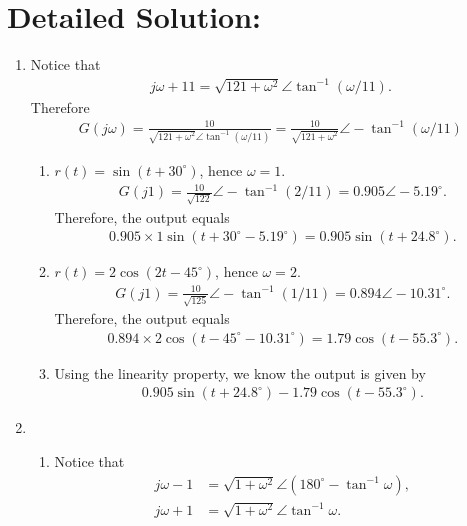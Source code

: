\documentclass{article}
\begin{document}
\section*{Detailed Solution:}

\begin{enumerate}
\item Notice that
  \begin{align*}
    j\omega + 11 = \sqrt{121+\omega^2}\angle \tan^{-1}(\omega/11).
  \end{align*}
  Therefore
  \begin{align*}
    G(j\omega) = \frac{10}{\sqrt{121+\omega^2}\angle \tan^{-1}(\omega/11)} = \frac{10}{\sqrt{121+\omega^2}}\angle -\tan^{-1}(\omega/11)
  \end{align*}
\begin{enumerate}
\item $r(t) = \sin(t+30^\circ)$, hence $\omega = 1$. 
  \begin{align*}
    G(j1) = \frac{10}{\sqrt{122}}\angle -\tan^{-1}(2/11) = 0.905\angle -5.19^\circ.
  \end{align*}
  Therefore, the output equals
  \begin{align*}
    0.905\times 1 \sin(t + 30^\circ-5.19^\circ) = 0.905\sin(t+24.8^\circ).
  \end{align*}
\item $r(t) = 2\cos(2t-45^\circ)$, hence $\omega = 2$. 
  \begin{align*}
    G(j1) = \frac{10}{\sqrt{125}}\angle -\tan^{-1}(1/11) = 0.894\angle -10.31^\circ.
  \end{align*}
  Therefore, the output equals
  \begin{align*}
    0.894\times 2 \cos(t - 45^\circ-10.31^\circ) = 1.79\cos(t-55.3^\circ).
  \end{align*}
\item Using the linearity property, we know the output is given by
 \begin{align*}
      0.905\sin(t+24.8^\circ)- 1.79\cos(t-55.3^\circ).
 \end{align*}
\end{enumerate}
\item \begin{enumerate}
  \item Notice that
    \begin{align*}
      j\omega -1 &= \sqrt{1+\omega^2}\angle(180^\circ- \tan^{-1}\omega),\\
      j\omega +1 &= \sqrt{1+\omega^2}\angle\tan^{-1}\omega.
    \end{align*}

\end{enumerate}
\end{enumerate}
\end{document}
